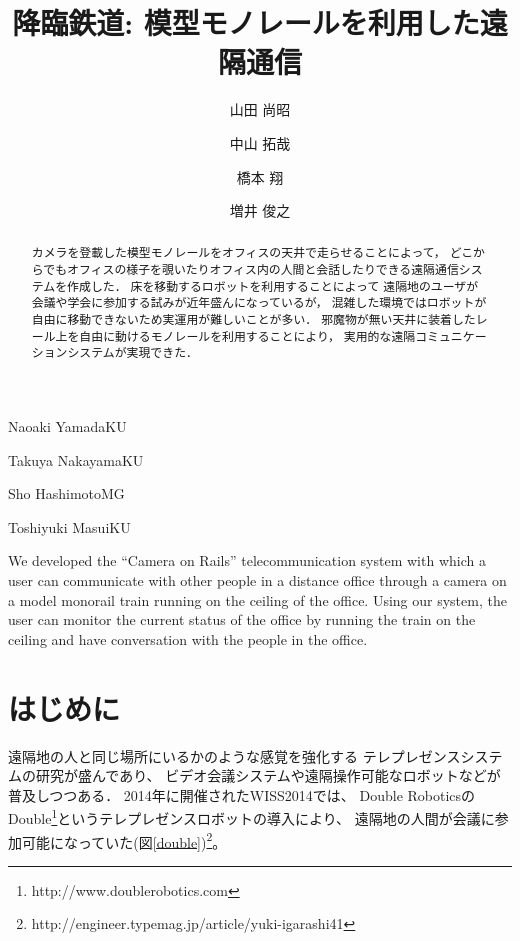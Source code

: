 \documentclass[submit,techreq]{ipsj}
\begin{document}
\title{降臨鉄道: 模型モノレールを利用した遠隔通信}



\author{山田 尚昭}{Naoaki Yamada}{KU}
\author{中山 拓哉}{Takuya Nakayama}{KU}
\author{橋本 翔}{Sho Hashimoto}{MG}
\author{増井 俊之}{Toshiyuki Masui}{KU}

\begin{abstract}
カメラを登載した模型モノレールをオフィスの天井で走らせることによって，
どこからでもオフィスの様子を覗いたりオフィス内の人間と会話したりできる遠隔通信システムを作成した．
床を移動するロボットを利用することによって
遠隔地のユーザが会議や学会に参加する試みが近年盛んになっているが，
混雑した環境ではロボットが自由に移動できないため実運用が難しいことが多い．
邪魔物が無い天井に装着したレール上を自由に動けるモノレールを利用することにより，
実用的な遠隔コミュニケーションシステムが実現できた．
\end{abstract}

\begin{eabstract}
We developed the ``Camera on Rails'' telecommunication system with
which a user can communicate with other people in a
distance office through a camera on a model monorail train running on the ceiling
of the office. Using our system, the user can monitor the current status
of the office by running the train on the ceiling and have
conversation with the people in the office.
\end{eabstract}

\maketitle

\section{はじめに}

遠隔地の人と同じ場所にいるかのような感覚を強化する
テレプレゼンスシステムの研究が盛んであり、
ビデオ会議システムや遠隔操作可能なロボットなどが普及しつつある．
%
2014年に開催されたWISS2014では、
Double RoboticsのDouble\footnote{
  \textsf{http://www.doublerobotics.com}
}というテレプレゼンスロボットの導入により、
遠隔地の人間が会議に参加可能になっていた(図\ref{double})\footnote{
  \textsf{http://engineer.typemag.jp/article/yuki-igarashi41}
}。
\end{document}
